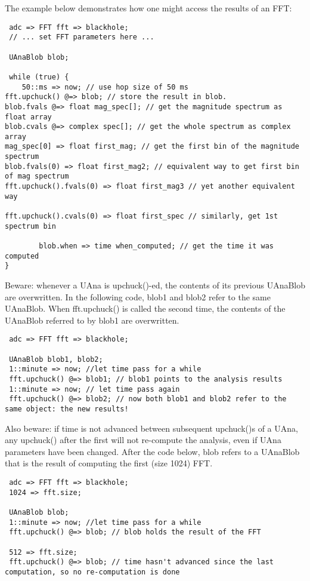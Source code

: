The example below demonstrates how one might access the results of an FFT:

\begin{verbatim}
 adc => FFT fft => blackhole;
 // ... set FFT parameters here ...

 UAnaBlob blob;

 while (true) {
 	50::ms => now; // use hop size of 50 ms
fft.upchuck() @=> blob; // store the result in blob.
blob.fvals @=> float mag_spec[]; // get the magnitude spectrum as float array
blob.cvals @=> complex spec[]; // get the whole spectrum as complex array
mag_spec[0] => float first_mag; // get the first bin of the magnitude spectrum
blob.fvals(0) => float first_mag2; // equivalent way to get first bin of mag spectrum
fft.upchuck().fvals(0) => float first_mag3 // yet another equivalent way

fft.upchuck().cvals(0) => float first_spec // similarly, get 1st spectrum bin	

        blob.when => time when_computed; // get the time it was computed
}
\end{verbatim}

Beware: whenever a UAna is upchuck()-ed, the contents of its previous UAnaBlob
are overwritten. In the following code, blob1 and blob2 refer to the same
UAnaBlob. When fft.upchuck() is called the second time, the contents of the
UAnaBlob referred to by blob1 are overwritten.

\begin{verbatim}
 adc => FFT fft => blackhole;

 UAnaBlob blob1, blob2;
 1::minute => now; //let time pass for a while
 fft.upchuck() @=> blob1; // blob1 points to the analysis results
 1::minute => now; // let time pass again
 fft.upchuck() @=> blob2; // now both blob1 and blob2 refer to the same object: the new results!
\end{verbatim}

Also beware: if time is not advanced between subsequent upchuck()s of a UAna,
any upchuck() after the first will not re-compute the analysis, even if UAna
parameters have been changed. After the code below, blob refers to a UAnaBlob
that is the result of computing the first (size 1024) FFT.

\begin{verbatim}
 adc => FFT fft => blackhole;
 1024 => fft.size;

 UAnaBlob blob;
 1::minute => now; //let time pass for a while
 fft.upchuck() @=> blob; // blob holds the result of the FFT

 512 => fft.size;
 fft.upchuck() @=> blob; // time hasn't advanced since the last computation, so no re-computation is done
\end{verbatim}

